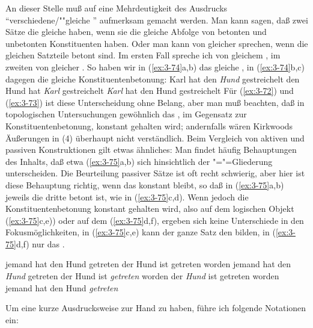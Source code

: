 \documentclass[output=paper]{langsci/langscibook}
\begin{document}
An dieser Stelle muß auf eine Mehrdeutigkeit des Ausdrucks
"`verschiedene/""gleiche "' aufmerksam gemacht werden. Man kann
sagen, daß zwei Sätze die gleiche  haben, wenn sie die gleiche
Abfolge von betonten und unbetonten Konstituenten haben. Oder man kann
von gleicher  sprechen, wenn die gleichen Satzteile betont
sind. Im ersten Fall spreche ich von gleichem
, im zweiten von gleicher
. So haben wir in (\ref{ex:3-74}a,b) das gleiche
, in (\ref{ex:3-74}b,c) dagegen die gleiche
Konstituentenbetonung:
\eal
\label{ex:3-74}
\ex
\label{ex:3-74a}
Karl hat den \textit{Hund} gestreichelt
\ex
\label{ex:3-74b}
den Hund hat \textit{Karl} gestreichelt
\ex
\label{ex:3-74c}
\textit{Karl} hat den Hund gestreichelt
\zl
Für (\ref{ex:3-72}) und (\ref{ex:3-73}) ist diese Unterscheidung ohne Belang, aber man muß
beachten, daß in topologischen Untersuchungen gewöhnlich das
, im Gegensatz zur Konstituentenbetonung, konstant
gehalten wird; andernfalls wären \zb Kirkwoods Äußerungen in (4)
überhaupt nicht verständlich. Beim Vergleich von aktiven und passiven
Konstruktionen gilt etwas ähnliches: Man findet häufig Behauptungen
des Inhalts, daß etwa (\ref{ex:3-75}a,b) sich hinsichtlich der
"="=Gliederung unterscheiden. Die Beurteilung passiver Sätze
ist oft recht schwierig, aber hier ist diese Behauptung richtig, wenn
das  konstant bleibt, so daß in (\ref{ex:3-75}a,b) jeweils die
dritte  betont ist, wie in (\ref{ex:3-75}c,d). Wenn jedoch die Konstituentenbetonung konstant gehalten wird, also auf dem logischen Objekt (\ref{ex:3-75}c,e)) oder auf dem  (\ref{ex:3-75}d,f), ergeben sich keine
Unterschiede in den Fokusmöglichkeiten, \dash in (\ref{ex:3-75}c,e) kann der
ganze Satz den  bilden, in (\ref{ex:3-75}d,f) nur das .
\begin{exe}
\ex
\label{ex:3-75}
\begin{xlist}
\ex
\label{ex:3-75a}
jemand hat den Hund getreten
\ex
\label{ex:3-75b}
der Hund ist getreten worden
\ex
\label{ex:3-75c}
jemand hat den \textit{Hund} getreten
\ex
\label{ex:3-75d}
der Hund ist \textit{getreten} worden
\ex
\label{ex:3-75e}
der \textit{Hund} ist getreten worden
\ex
\label{ex:3-75f}
jemand hat den Hund \textit{getreten}
\end{xlist}
\end{exe}
Um eine kurze Ausdrucksweise zur Hand zu haben, führe ich folgende Notationen ein:
\end{document}
